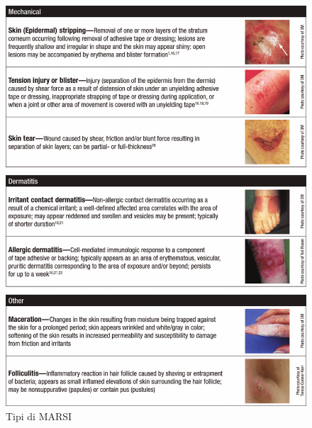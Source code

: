 \begin{figure}[H]
    \begin{center}
    \includegraphics[width=0.8\columnwidth]{img/Types-of-adhesive-related-skin-injury.jpg}
    \vspace{-3mm}
    \end{center}
    \caption{Tipi di MARSI
    \cite{img58}}
    \label{fig:FIGURE_4.22}
\end{figure}
